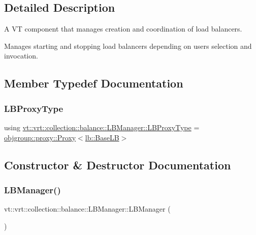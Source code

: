 \subsection{Detailed Description}
A VT component that manages creation and coordination of load balancers. 

Manages starting and stopping load balancers depending on user\textquotesingle{}s selection and invocation. 

\subsection{Member Typedef Documentation}
\mbox{\label{structvt_1_1vrt_1_1collection_1_1balance_1_1_l_b_manager_a8b1a7735366beb85c2c2ccc3912cdd80}} 
\subsubsection{\texorpdfstring{L\+B\+Proxy\+Type}{LBProxyType}}
{\footnotesize\ttfamily using \hyperlink{structvt_1_1vrt_1_1collection_1_1balance_1_1_l_b_manager_a8b1a7735366beb85c2c2ccc3912cdd80}{vt\+::vrt\+::collection\+::balance\+::\+L\+B\+Manager\+::\+L\+B\+Proxy\+Type} =  \hyperlink{structvt_1_1objgroup_1_1proxy_1_1_proxy}{objgroup\+::proxy\+::\+Proxy}$<$\hyperlink{structvt_1_1vrt_1_1collection_1_1lb_1_1_base_l_b}{lb\+::\+Base\+LB}$>$}



\subsection{Constructor \& Destructor Documentation}
\mbox{\label{structvt_1_1vrt_1_1collection_1_1balance_1_1_l_b_manager_a4adad6931af7d5ff2cb983859ed939f3}} 
\subsubsection{\texorpdfstring{L\+B\+Manager()}{LBManager()}\hspace{0.1cm}{\footnotesize\ttfamily [1/3]}}
{\footnotesize\ttfamily vt\+::vrt\+::collection\+::balance\+::\+L\+B\+Manager\+::\+L\+B\+Manager (\begin{DoxyParamCaption}{ }\end{DoxyParamCaption})\hspace{0.3cm}{\ttfamily [default]}}



